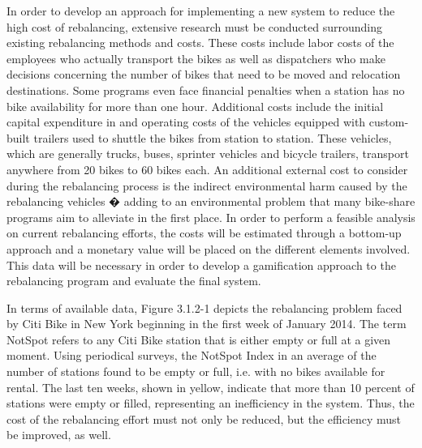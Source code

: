 \documentclass{sig-alternate}
\begin{document}
In order to develop an approach for implementing a new system to reduce the high cost of rebalancing, extensive research must be conducted surrounding existing rebalancing methods and costs. These costs include labor costs of the employees who actually transport the bikes as well as dispatchers who make decisions concerning the number of bikes that need to be moved and relocation destinations. Some programs even face financial penalties when a station has no bike availability for more than one hour. Additional costs include the initial capital expenditure in and operating costs of the vehicles equipped with custom-built trailers used to shuttle the bikes from station to station. These vehicles, which are generally trucks, buses, sprinter vehicles and bicycle trailers, transport anywhere from 20 bikes to 60 bikes each. An additional external cost to consider during the rebalancing process is the indirect environmental harm caused by the rebalancing vehicles � adding to an environmental problem that many bike-share programs aim to alleviate in the first place. In order to perform a feasible analysis on current rebalancing efforts, the costs will be estimated through a bottom-up approach and a monetary value will be placed on the different elements involved. This data will be necessary in order to develop a gamification approach to the rebalancing program and evaluate the final system. \newline

In terms of available data, Figure 3.1.2-1 depicts the rebalancing problem faced by Citi Bike in New York beginning in the first week of January 2014. The term NotSpot refers to any Citi Bike station that is either empty or full at a given moment. Using periodical surveys, the NotSpot Index in an average of the number of stations found to be empty or full, i.e. with no bikes available for rental. The last ten weeks, shown in yellow, indicate that more than 10 percent of stations were empty or filled, representing an inefficiency in the system. Thus, the cost of the rebalancing effort must not only be reduced, but the efficiency must be improved, as well. \newline
\end{document}

